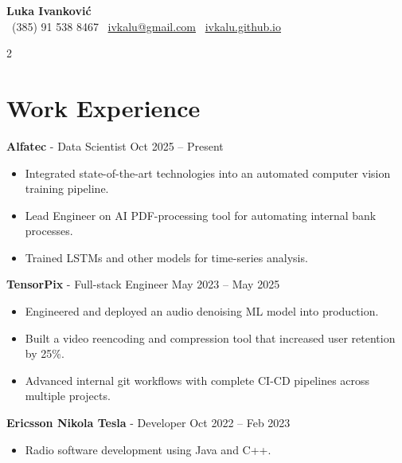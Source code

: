 \documentclass[a4paper,10pt]{article}
\begin{document}
\begin{center}
    {\Huge\bfseries Luka Ivanković} \\[4pt]
    {\color{midgray}
    \faPhone\ (385) 91 538 8467 \quad
    \faEnvelope\ \href{mailto:ivkalu@gmail.com}{ivkalu@gmail.com} \quad
    \faGithub\ \href{https://ivkalu.github.io/}{ivkalu.github.io}
    }
\end{center}

\vspace{6mm}

\begin{paracol}{2}

\section*{Work Experience}

\textbf{Alfatec} - Data Scientist \hfill {\color{midgray}Oct 2025 -- Present}
\begin{itemize}
    \item Integrated state-of-the-art technologies into an automated computer vision training pipeline.
    \item Lead Engineer on AI PDF-processing tool for automating internal bank processes.
    \item Trained LSTMs and other models for time-series analysis.
\end{itemize}

\vspace{2mm}

\textbf{TensorPix} - Full-stack Engineer \hfill {\color{midgray}May 2023 -- May 2025}
\begin{itemize}
    \item Engineered and deployed an audio denoising ML model into production.
    \item Built a video reencoding and compression tool that increased user retention by 25\%.
    \item Advanced internal git workflows with complete CI-CD pipelines across multiple projects.
\end{itemize}

\vspace{2mm}

\textbf{Ericsson Nikola Tesla} - Developer \hfill {\color{midgray}Oct 2022 -- Feb 2023}
\begin{itemize}
    \item Radio software development using Java and C++.
\end{itemize}


\end{paracol}
\end{document}

